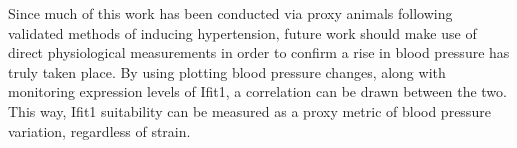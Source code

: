 Since much of this work has been conducted via proxy animals following validated methods of inducing hypertension, future work should make use of direct physiological measurements in order to confirm a rise in blood pressure has truly taken place. By using plotting blood pressure changes, along with monitoring expression levels of Ifit1, a correlation can be drawn between the two. This way, Ifit1 suitability can be measured as a proxy metric of blood pressure variation, regardless of strain. 







